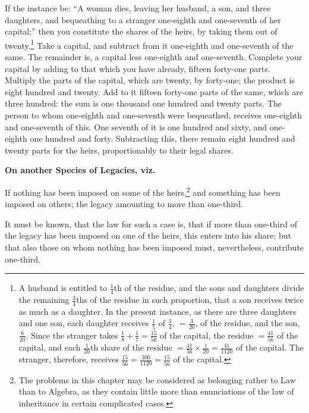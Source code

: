 If the instance be: ``A woman dies, leaving her husband, a son, and three daughters, and bequeathing to a stranger one-eighth and one-seventh of her capital;'' then you constitute the shares of the heirs, by taking them out of twenty.\footnote{A husband is entitled to $\frac{1}{4}$th of the residue, and the sons and daughters divide the remaining $\frac{3}{4}$ths of the residue in such proportion, that a son receives twice as much as a daughter. In the present instance, as there are three daughters and one son, each daughter receives $\frac{1}{5}$ of $\frac{3}{4}$, $= \frac{3}{20}$, of the residue, and the son, $\frac{6}{20}$. Since the stranger takes $\frac{1}{8} + \frac{1}{7} = \frac{15}{56}$ of the capital, the residue $= \frac{41}{56}$ of the capital, and each $\frac{1}{20}$th share of the residue $= \frac{41}{56} \times \frac{1}{20} = \frac{41}{1120}$ of the capital. The stranger, therefore, receives $\frac{15}{56} = \frac{300}{1120} = \frac{15}{56}$ of the capital.} Take a capital, and subtract from it one-eighth and one-seventh of the same. The remainder is, a capital less one-eighth and one-seventh. Complete your capital by adding to that which you have already, fifteen forty-one parts. Multiply the parts of the capital, which are twenty, by forty-one; the product is eight hundred and twenty. Add to it fifteen forty-one parts of the same, which are three hundred: the sum is one thousand one hundred and twenty parts. The person to whom one-eighth and one-seventh were bequeathed, receives one-eighth and one-seventh of this. One seventh of it is one hundred and sixty, and one-eighth one hundred and forty. Subtracting this, there remain eight hundred and twenty parts for the heirs, proportionably to their legal shares.

\vspace{0.3cm}
\noindent\textbf{On another Species of Legacies, viz.}

If nothing has been imposed on some of the heirs,\footnote{The problems in this chapter may be considered as belonging rather to Law than to Algebra, as they contain little more than enunciations of the law of inheritance in certain complicated cases.} and something has been imposed on others; the legacy amounting to more than one-third.

It must be known, that the law for such a case is, that if more than one-third of the legacy has been imposed on one of the heirs, this enters into his share; but that also those on whom nothing has been imposed must, nevertheless, contribute one-third.

